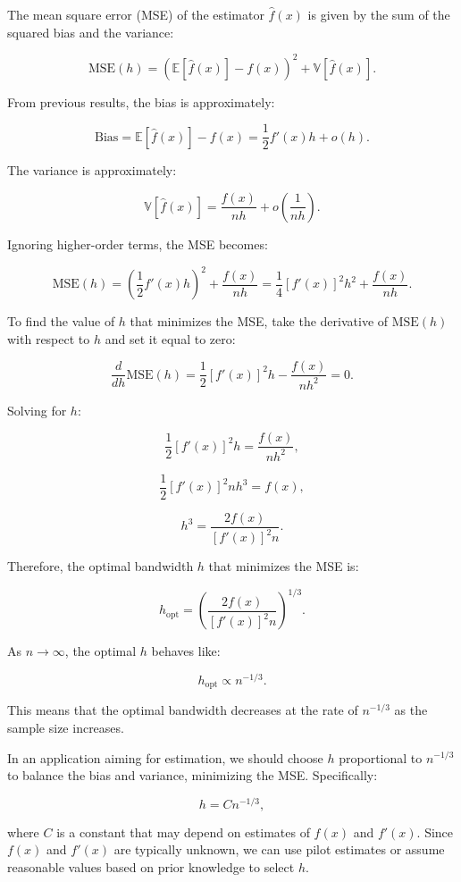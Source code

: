\documentclass{article}
\begin{document}
The mean square error (MSE) of the estimator \( \hat{f}(x) \) is given by the sum of the squared bias and the variance:

\[
\text{MSE}(h) = \left( \mathbb{E}[\hat{f}(x)] - f(x) \right)^2 + \mathbb{V}[\hat{f}(x)].
\]

From previous results, the bias is approximately:

\[
\text{Bias} = \mathbb{E}[\hat{f}(x)] - f(x) = \frac{1}{2} f'(x) h + o(h).
\]

The variance is approximately:

\[
\mathbb{V}[\hat{f}(x)] = \frac{f(x)}{n h} + o\left( \frac{1}{n h} \right).
\]

Ignoring higher-order terms, the MSE becomes:

\[
\text{MSE}(h) = \left( \frac{1}{2} f'(x) h \right)^2 + \frac{f(x)}{n h} = \frac{1}{4} [f'(x)]^2 h^2 + \frac{f(x)}{n h}.
\]

To find the value of \( h \) that minimizes the MSE, take the derivative of \( \text{MSE}(h) \) with respect to \( h \) and set it equal to zero:

\[
\frac{d}{d h} \text{MSE}(h) = \frac{1}{2} [f'(x)]^2 h - \frac{f(x)}{n h^2} = 0.
\]

Solving for \( h \):

\[
\frac{1}{2} [f'(x)]^2 h = \frac{f(x)}{n h^2},
\]

\[
\frac{1}{2} [f'(x)]^2 n h^3 = f(x),
\]

\[
h^3 = \frac{2 f(x)}{[f'(x)]^2 n}.
\]

Therefore, the optimal bandwidth \( h \) that minimizes the MSE is:

\[
h_{\text{opt}} = \left( \frac{2 f(x)}{[f'(x)]^2 n} \right)^{1/3}.
\]

As \( n \to \infty \), the optimal \( h \) behaves like:

\[
h_{\text{opt}} \propto n^{-1/3}.
\]

This means that the optimal bandwidth decreases at the rate of \( n^{-1/3} \) as the sample size increases.

In an application aiming for estimation, we should choose \( h \) proportional to \( n^{-1/3} \) to balance the bias and variance, minimizing the MSE. Specifically:

\[
h = C n^{-1/3},
\]

where \( C \) is a constant that may depend on estimates of \( f(x) \) and \( f'(x) \). Since \( f(x) \) and \( f'(x) \) are typically unknown, we can use pilot estimates or assume reasonable values based on prior knowledge to select \( h \).
\end{document}
